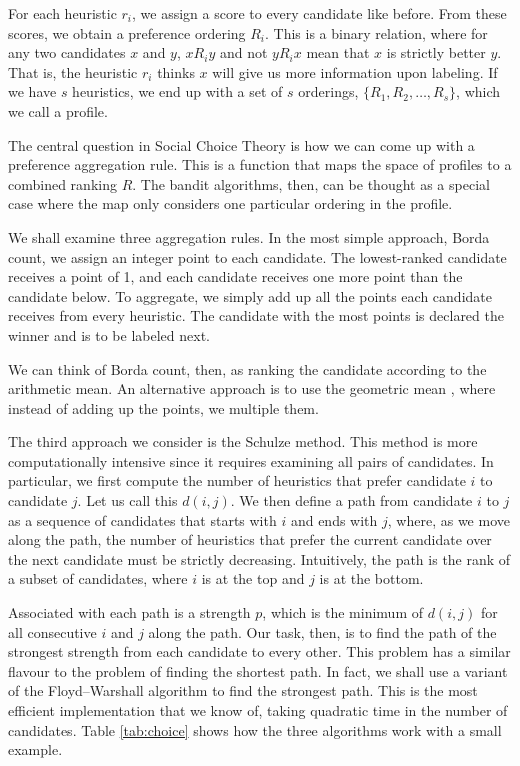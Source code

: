 \documentclass[fleqn,10pt,lineno]{wlpeerj} %
\begin{document}
For each heuristic $r_i$, we assign a score to every candidate like before.
From these scores, we obtain a preference ordering $R_i$. This is a binary
relation, where for any two candidates $x$ and $y$, $xR_iy$ and not $yR_ix$
mean that $x$ is strictly better $y$. That is, the heuristic $r_i$ thinks $x$
will give us more information upon labeling. If we have $s$ heuristics, we end
up with a set of $s$ orderings, $\{ R_1, R_2, \ldots, R_s \}$, which we call a
profile.

The central question in Social Choice Theory is how we can come up with a
preference aggregation rule. This is a function that maps the space of profiles
to a combined ranking $R$. The bandit algorithms, then, can be thought as a
special case where the map only considers one particular ordering in the
profile.

We shall examine three aggregation rules. In the most simple approach, Borda
count, we assign an integer point to each candidate. The lowest-ranked
candidate receives a point of 1, and each candidate receives one more point
than the candidate below. To aggregate, we simply add up all the points each
candidate receives from every heuristic. The candidate with the most points
is declared the winner and is to be labeled next.

We can think of Borda count, then, as ranking the candidate according to the
arithmetic mean. An alternative approach is to use the geometric mean
\citep{bedo14}, where instead of adding up the points, we multiple them.

The third approach we consider is the Schulze method. This method is more
computationally intensive since it requires examining all pairs of candidates.
In particular, we first compute the number of heuristics that prefer
candidate $i$ to candidate $j$. Let us call this $d(i, j)$. We then define a
path from candidate $i$ to $j$ as a sequence of candidates that starts with $i$
and ends with $j$, where, as we move along the path, the number of heuristics
that prefer the current candidate over the next candidate must be strictly decreasing.
Intuitively, the path is the rank of a subset of candidates, where $i$ is at
the top and $j$ is at the bottom.

Associated with each path is a strength $p$, which is the minimum of $d(i, j)$
for all consecutive $i$ and $j$ along the path. Our task, then, is to find the
path of the strongest strength from each candidate to every other. This problem
has a similar flavour to the problem of finding the shortest path. In fact, we
shall use a variant of the Floyd–Warshall algorithm to find the strongest path.
This is the most efficient implementation that we know of, taking quadratic
time in the number of candidates. Table \ref{tab:choice} shows how the three
algorithms work with a small example.
\end{document}
